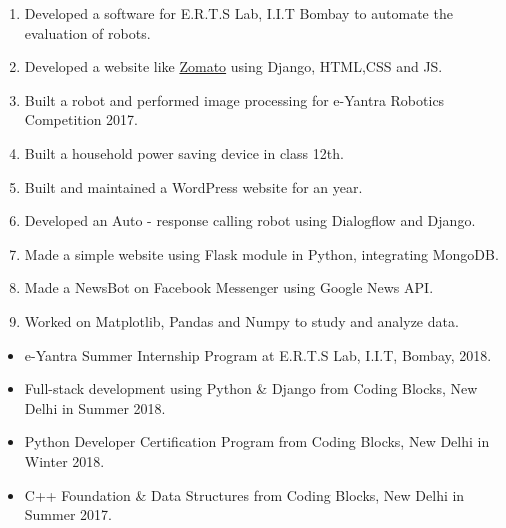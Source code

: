 \documentclass{article}
\begin{document}
		\begin{enumerate}
			\LARGE
			\color{red}	
			\item Developed a software for E.R.T.S Lab, I.I.T Bombay to automate the evaluation of robots.
			\color{blue}	
			\item Developed a website like \href{http://zomato-proj.herokuapp.com} {Zomato} using Django, HTML,CSS and JS.
			\color{red}
			\item Built a robot and performed image processing for e-Yantra Robotics Competition 2017.
			\color{blue}
			\item Built a household power saving device in class 12th.
		\color{red}	\item Built and maintained a WordPress website for an year.
		\color{blue} \item Developed an Auto - response calling robot using Dialogflow and Django.
		
			\color{red} \item Made a simple website using Flask module in Python, integrating MongoDB.
		\color{blue}	\item Made a NewsBot on Facebook Messenger using Google News API.
		\color{red}	\item Worked on Matplotlib, Pandas and Numpy to study and analyze data.
			
		\end{enumerate}
	\LARGE
		\begin{itemize}
		\color{black}	\item e-Yantra Summer Internship Program at E.R.T.S Lab, I.I.T, Bombay, 2018.
		\color{black}	\item Full-stack development using Python \& Django from Coding Blocks, New Delhi in Summer 2018.
		\color{black}	\item Python Developer Certification Program from Coding Blocks, New Delhi in Winter 2018.
			\color{black}	\item C++ Foundation \& Data Structures from Coding Blocks, New Delhi in Summer 2017.
			
		\end{itemize}
				
%			
%				
	
\end{document}
